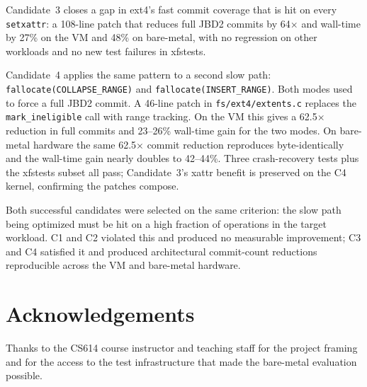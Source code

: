 \documentclass[11pt,a4paper]{article}
\begin{document}
Candidate~3 closes a gap in ext4's fast commit coverage that is hit
on every \texttt{setxattr}: a 108-line patch that reduces full JBD2
commits by 64$\times$ and wall-time by 27\% on the VM and 48\% on
bare-metal, with no regression on other workloads and no new test
failures in xfstests.

Candidate~4 applies the same pattern to a second slow path:
\texttt{fallocate(COLLAPSE\_RANGE)} and
\texttt{fallocate(INSERT\_RANGE)}. Both modes used to force a full
JBD2 commit. A 46-line patch in \texttt{fs/ext4/extents.c} replaces
the \texttt{mark\_ineligible} call with range tracking. On the VM
this gives a 62.5$\times$ reduction in full commits and 23--26\%
wall-time gain for the two modes. On bare-metal hardware the same
62.5$\times$ commit reduction reproduces byte-identically and the
wall-time gain nearly doubles to 42--44\%. Three crash-recovery
tests plus the xfstests subset all pass; Candidate~3's xattr
benefit is preserved on the C4 kernel, confirming the patches
compose.

Both successful candidates were selected on the same criterion:
the slow path being optimized must be hit on a high fraction of
operations in the target workload. C1 and C2 violated this and
produced no measurable improvement; C3 and C4 satisfied it and
produced architectural commit-count reductions reproducible
across the VM and bare-metal hardware.

\section*{Acknowledgements}

Thanks to the CS614 course instructor and teaching staff for the
project framing and for the access to the test infrastructure that
made the bare-metal evaluation possible.
\end{document}
